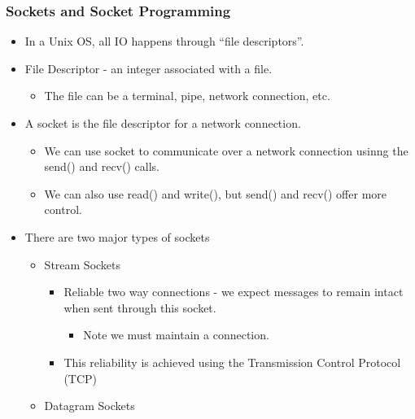 \hypertarget{sockets-and-socket-programming}{%
\subsubsection{Sockets and Socket
Programming}\label{sockets-and-socket-programming}}

\begin{itemize}
\tightlist
\item
  In a Unix OS, all IO happens through ``file descriptors''.
\item
  File Descriptor - an integer associated with a file.

  \begin{itemize}
  \tightlist
  \item
    The file can be a terminal, pipe, network connection, etc.
  \end{itemize}
\item
  A socket is the file descriptor for a network connection.

  \begin{itemize}
  \tightlist
  \item
    We can use socket to communicate over a network connection usinng
    the send() and recv() calls.
  \item
    We can also use read() and write(), but send() and recv() offer more
    control.
  \end{itemize}
\item
  There are two major types of sockets

  \begin{itemize}
  \tightlist
  \item
    Stream Sockets

    \begin{itemize}
    \tightlist
    \item
      Reliable two way connections - we expect messages to remain intact
      when sent through this socket.

      \begin{itemize}
      \tightlist
      \item
        Note we must maintain a connection.
      \end{itemize}
    \item
      This reliability is achieved using the Transmission Control
      Protocol (TCP)
    \end{itemize}
  \item
    Datagram Sockets


\end{itemize}
\end{itemize}
